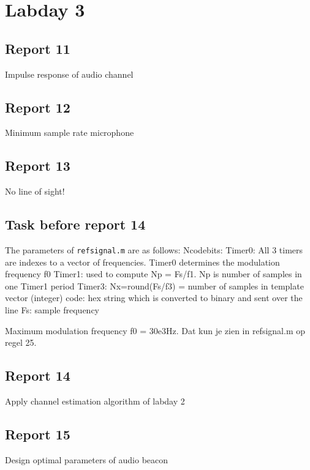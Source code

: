 \documentclass[11pt,titlepage]{report}
\begin{document}
\section{Labday 3}
\subsection{Report 11}
Impulse response of audio channel

\subsection{Report 12}
Minimum sample rate \@ microphone

\subsection{Report 13}
No line of sight!

\subsection{Task before report 14}
The parameters of \texttt{refsignal.m} are as follows:
Ncodebits: 
Timer0: All 3 timers are indexes to a vector of frequencies. Timer0 determines the modulation frequency f0
Timer1: used to compute Np = Fs/f1. Np is number of samples in one Timer1 period
Timer3: Nx=round(Fs/f3) = number of samples in template vector (integer)
code: hex string which is converted to binary and sent over the line
Fs: sample frequency

Maximum modulation frequency f0 = 30e3Hz. Dat kun je zien in refsignal.m op regel 25.



\subsection{Report 14}
Apply channel estimation algorithm of labday 2

\subsection{Report 15}
Design optimal parameters of audio beacon
\end{document}
